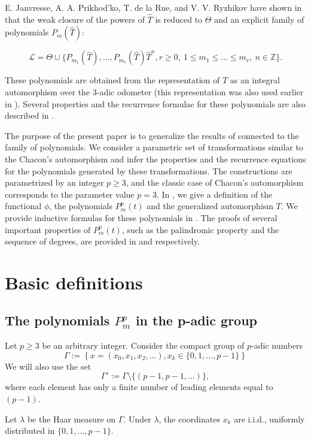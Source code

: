 \documentclass[a4paper]{article}
\theoremstyle{plain}
\theoremstyle{definition}
\begin{document}
E. Janvresse, A. A. Prikhod’ko, T. de la Rue, and V. V. Ryzhikov have shown in \cite{weaklimits} that the weak closure of the powers of $\hat{T}$ is reduced to $\Theta$
and an explicit family of polynomials $P_m(\hat{T})$:

$$
\mathcal{L} = {\Theta} \cup \{P_{m_1}(\hat{T}),\ldots,P_{m_r}(\hat{T})\hat{T}^n,r\ge0,\ 1\le m_1\le\ldots\le m_r,\ n\in \mathbb{Z}\}.
$$
 
 These polynomials are obtained from the representation of $T$ as an integral automorphism over the $3$-adic odometer (this representation was also used earlier in \cite{convolutions}). Several properties and the recurrence formulae for these polynomials are also described in \cite{weaklimits}.

The purpose of the present paper is to generalize the results of \cite{weaklimits} connected to the family of polynomials. We consider a parametric set of transformations similar to the Chacon’s automorphism and infer the properties and the recurrence equations for the polynomials generated by these transformations. The constructions are parametrized by an integer $p \ge 3$, and the classic case of Chacon's automorphism corresponds to the parameter value $p=3$. In , we give a definition of the functional $\phi$, the polynomials $P_m^p(t)$ and the generalized automorphism $T$. We provide
inductive formulas for these polynomials in . The proofs of several important properties of $P_m^p(t)$, such as the palindromic property and the sequence of degrees, are provided in  and  respectively. 

\section{Basic definitions}\label{definitions}
\subsection{The polynomials $P_m^p$ in the p-adic group}
Let $p \ge 3$ be an arbitrary integer.
Consider the compact group of $p$-adic numbers
$$\Gamma := \left\{x = \left(x_0, x_1, x_2, \ldots \right), x_k \in \{0, 1, \ldots, p - 1\} \right\}$$
We will also use the set
$$\Gamma' := \Gamma \setminus \{(p-1,p-1,\ldots)\},$$
where each element has only a finite number of leading elements equal to $(p-1)$.

Let $\lambda$ be the Haar measure on $\Gamma$. Under $\lambda$, the coordinates $x_k$ are i.i.d., uniformly distributed in $\{0, 1, \ldots, p - 1\}$.
\end{document}

